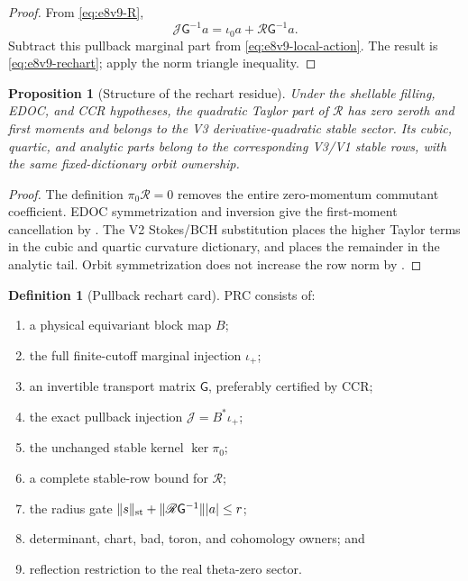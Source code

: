 \documentclass[11pt,oneside]{book}
\newtheorem{proposition}[theorem]{Proposition}
\theoremstyle{definition}
\newtheorem{definition}[theorem]{Definition}
\theoremstyle{remark}
\begin{document}
\begin{proof}
From \eqref{eq:e8v9-R},
\[
 {\mathscr J}{\mathsf G}^{-1}a
 =\iota_0a+{\mathscr R}{\mathsf G}^{-1}a.
\]
Subtract this pullback marginal part from
\eqref{eq:e8v9-local-action}.  The result is
\eqref{eq:e8v9-rechart}; apply the norm triangle inequality.
\end{proof}

\begin{proposition}[Structure of the rechart residue]
\label{prop:e8v9-R-structure}
Under the shellable filling, EDOC, and CCR hypotheses, the quadratic
Taylor part of \({\mathscr R}\) has zero zeroth and first moments and
belongs to the V3 derivative-quadratic stable sector.  Its cubic,
quartic, and analytic parts belong to the corresponding V3/V1 stable
rows, with the same fixed-dictionary orbit ownership.
\end{proposition}

\begin{proof}
The definition \(\pi_0{\mathscr R}=0\) removes the entire
zero-momentum commutant coefficient.  EDOC symmetrization and
inversion give the first-moment cancellation by
.  The V2 Stokes/BCH substitution
places the higher Taylor terms in the cubic and quartic curvature
dictionary, and  places the remainder in the
analytic tail.  Orbit symmetrization does not increase the row norm
by .
\end{proof}

\begin{definition}[Pullback rechart card]
\label{def:e8v9-card}
PRC consists of:
\begin{enumerate}[label=\textup{(R\arabic*)},leftmargin=4em]
\item a physical equivariant block map \(B\);
\item the full finite-cutoff marginal injection \(\iota_+\);
\item an invertible transport matrix \({\mathsf G}\), preferably
      certified by CCR;
\item the exact pullback injection \({\mathscr J}=B^*\iota_+\);
\item the unchanged stable kernel \(\ker\pi_0\);
\item a complete stable-row bound for \({\mathscr R}\);
\item the radius gate
      \(\|s\|_{\rm st}+
       \|{\mathscr R}{\mathsf G}^{-1}\||a|\le r\);
\item determinant, chart, bad, toron, and cohomology owners; and
\item reflection restriction to the real theta-zero sector.
\end{enumerate}
\end{definition}
\end{document}
